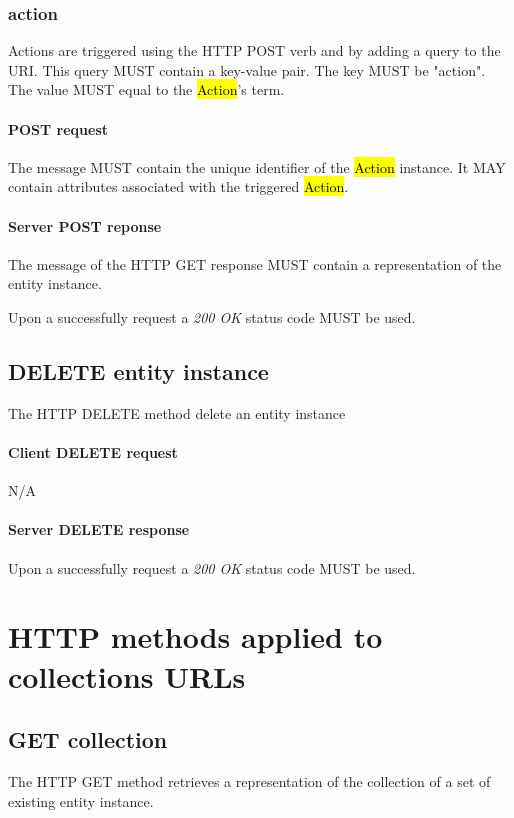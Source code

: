 \documentclass[10pt,a4paper]{article}
\begin{document}
\subsubsection{action}
Actions are triggered using the HTTP POST verb and by adding a query to the URI. This query MUST contain a key-value pair. The key MUST be "action". The value MUST equal to the \hl{Action}'s term.

\paragraph{POST request}
The message MUST contain the unique identifier of the \hl{Action} instance. It MAY contain attributes associated with the triggered \hl{Action}.

\paragraph{Server POST reponse}
The message of the HTTP GET response MUST contain a representation of the entity instance.

Upon a successfully request a \emph{200 OK} status code MUST be used.

\subsection{DELETE entity instance}
The HTTP DELETE method delete an entity instance

\paragraph{Client DELETE request}
N/A

\paragraph{Server DELETE response}
Upon a successfully request a \emph{200 OK} status code MUST be used.

\section{HTTP methods applied to collections URLs}

\subsection{GET collection}
The HTTP GET method retrieves a representation of the collection of a set of existing entity instance.
\end{document}
